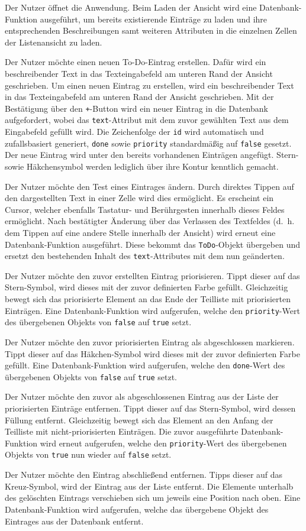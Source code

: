 Der Nutzer öffnet die Anwendung. Beim Laden der Ansicht wird eine Datenbank-Funktion ausgeführt, um bereits existierende Einträge zu laden und ihre entsprechenden Beschreibungen samt weiteren Attributen in die einzelnen Zellen der Listenansicht zu laden. 

Der Nutzer möchte einen neuen To-Do-Eintrag erstellen. Dafür wird ein beschreibender Text in das Texteingabefeld am unteren Rand der Ansicht geschrieben. Um einen neuen Eintrag zu erstellen, wird ein beschreibender Text in das Texteingabefeld am unteren Rand der Ansicht geschrieben. Mit der Bestätigung über den \texttt{+}-Button wird ein neuer Eintrag in die Datenbank aufgefordert, wobei das \texttt{text}-Attribut mit dem zuvor gewählten Text aus dem Eingabefeld gefüllt wird. Die Zeichenfolge der \texttt{id} wird automatisch und zufallsbasiert generiert, \texttt{done} sowie \texttt{priority} standardmäßig auf \texttt{false} gesetzt. Der neue Eintrag wird unter den bereits vorhandenen Einträgen angefügt. Stern- sowie Häkchensymbol werden lediglich über ihre Kontur kenntlich gemacht.

Der Nutzer möchte den Test eines Eintrages ändern. Durch direktes Tippen auf den dargestellten Text in einer Zelle wird dies ermöglicht. Es erscheint ein Cursor, welcher ebenfalls Tastatur- und Berührgesten innerhalb dieses Feldes ermöglicht. Nach bestätigter Änderung über das Verlassen des Textfeldes (d.\ h. dem Tippen auf eine andere Stelle innerhalb der Ansicht) wird erneut eine Datenbank-Funktion ausgeführt. Diese bekommt das \texttt{ToDo}-Objekt übergeben und ersetzt den bestehenden Inhalt des \texttt{text}-Attributes mit dem nun geänderten.

Der Nutzer möchte den zuvor erstellten Eintrag priorisieren. Tippt dieser auf das Stern-Symbol, wird dieses mit der zuvor definierten Farbe gefüllt. Gleichzeitig bewegt sich das priorisierte Element an das Ende der Teilliste mit priorisierten Einträgen. Eine Datenbank-Funktion wird aufgerufen, welche den \texttt{priority}-Wert des übergebenen Objekts von \texttt{false} auf \texttt{true} setzt.

Der Nutzer möchte den zuvor priorisierten Eintrag als abgeschlossen markieren. Tippt dieser auf das Häkchen-Symbol wird dieses mit der zuvor definierten Farbe gefüllt. Eine Datenbank-Funktion wird aufgerufen, welche den \texttt{done}-Wert des übergebenen Objekts von \texttt{false} auf \texttt{true} setzt.

Der Nutzer möchte den zuvor als abgeschlossenen Eintrag aus der Liste der priorisierten Einträge entfernen. Tippt dieser auf das Stern-Symbol, wird dessen Füllung entfernt. Gleichzeitig bewegt sich das Element an den Anfang der Teilliste mit nicht-priorisierten Einträgen. Die zuvor ausgeführte Datenbank-Funktion wird erneut aufgerufen, welche den \texttt{priority}-Wert des übergebenen Objekts von \texttt{true} nun wieder auf \texttt{false} setzt.

Der Nutzer möchte den Eintrag abschließend entfernen. Tipps dieser auf das Kreuz-Symbol, wird der Eintrag aus der Liste entfernt. Die Elemente unterhalb des gelöschten Eintrags verschieben sich um jeweils eine Position nach oben. Eine Datenbank-Funktion wird aufgerufen, welche das übergebene Objekt des Eintrages aus der Datenbank entfernt.
